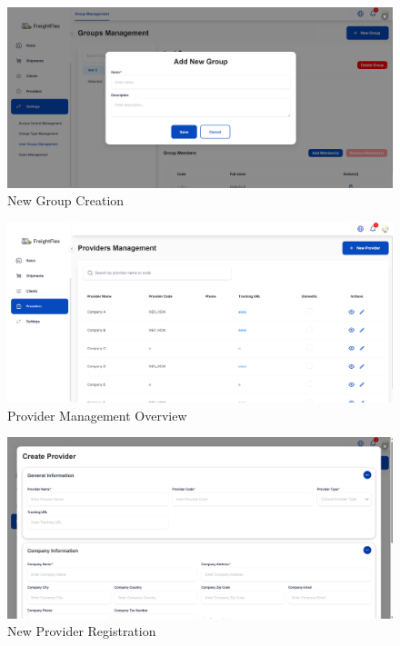 \begin{figure}[H]
    \centering
    \includegraphics[width=15cm]{graphics/UI/new-group.png}
    \caption{New Group Creation}
    \label{fig:new-group}
\end{figure}

\begin{figure}[H]
    \centering
    \includegraphics[width=15cm]{graphics/UI/provider-management.png}
    \caption{Provider Management Overview}
    \label{fig:provider-management}
\end{figure}

\begin{figure}[H]
    \centering
    \includegraphics[width=15cm]{graphics/UI/new-provider.png}
    \caption{New Provider Registration}
    \label{fig:new-provider}
\end{figure}

